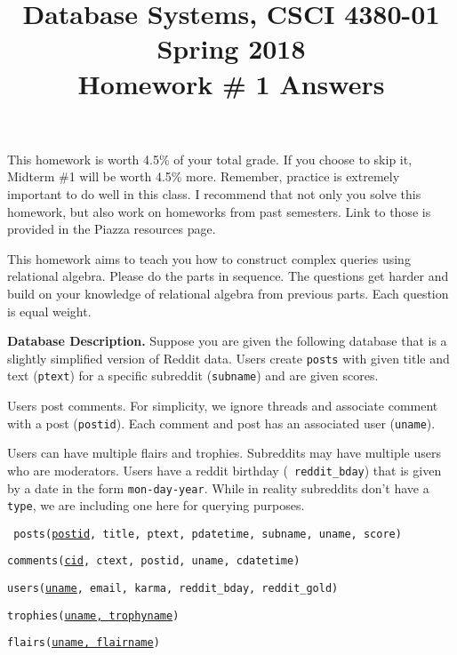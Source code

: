 \documentclass[11pt]{article}
\title{Database Systems, CSCI 4380-01 Spring 2018 \\
Homework \# 1 Answers}
\date{}
\begin{document}
\maketitle

\vspace*{-0.7in}

 This homework is worth 4.5\% of
your total grade. If you choose to skip it, Midterm \#1 will be worth
4.5\% more. Remember, practice is extremely important to do well in
this class. I recommend that not only you solve this homework, but
also work on homeworks from past semesters. Link to those is provided
in the Piazza resources page.

This homework aims to teach you how to construct complex queries using
relational algebra. Please do the parts in sequence. The questions get
harder and build on your knowledge of relational algebra from previous
parts. Each question is equal weight.

{\bf Database Description.} Suppose you are given the following
database that is a slightly simplified version of Reddit data. Users
create {\tt posts} with given title and text ({\tt ptext}) for a
specific subreddit ({\tt subname}) and are given scores.

Users post comments. For simplicity, we ignore threads and associate
comment with a post ({\tt postid}). Each comment and post has an
associated user ({\tt uname}).

Users can have multiple flairs and trophies. Subreddits may have
multiple users who are moderators. Users have a reddit birthday ({\tt
  reddit\_bday}) that is given by a date in the form
\verb+mon-day-year+. While in reality subreddits don't have a {\tt
  type}, we are including one here for querying purposes.

\hspace*{0.1in} {\tt 
posts(\underline{postid}, title, ptext, pdatetime, subname, uname, score)}

\hspace*{0.1in} {\tt comments(\underline{cid}, ctext, postid, uname, cdatetime)}

\hspace*{0.1in} {\tt users(\underline{uname}, email, karma, reddit\_bday, reddit\_gold)}

\hspace*{0.1in} {\tt trophies(\underline{uname, trophyname})}

\hspace*{0.1in} {\tt flairs(\underline{uname, flairname})}
\end{document}
